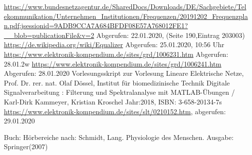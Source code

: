 \begin{thebibliography}{99}

 \url{https://www.bundesnetzagentur.de/SharedDocs/Downloads/DE/Sachgebiete/Telekommunikation/Unternehmen_Institutionen/Frequenzen/20191202_Frequenzplan.pdf;jsessionid=9ADB9CCA7A684BFDF08E57A768012FE1?__blob=publicationFile&v=2} Abgerufen: 22.01.2020, (Seite 190,Eintrag 203003)
 \url{https://de.wikipedia.org/wiki/Equalizer} Abgerufen: 25.01.2020, 10:56 Uhr
 \url{https://www.elektronik-kompendium.de/sites/grd/1006231.htm}
Abgerufen: 28.01.2w
 \url{https://www.elektronik-kompendium.de/sites/grd/1006241.htm} Abgerufen: 28.01.2020
 Vorlesungsskript zur Vorlesung Lineare Elektrische Netze, Prof. Dr. rer. nat. Olaf Dössel, Institut für biomedizinische Technik
 Digitale Signalverarbeitung : Filterung und Spektralanalyse mit MATLAB-Übungen / Karl-Dirk Kammeyer, Kristian Kroschel Jahr:2018, ISBN: 3-658-20134-7s
 \url{https://www.elektronik-kompendium.de/sites/slt/0210152.htm}, abgerufen: 29.01.2020


 Buch: Hörbereiche nach: Schmidt, Lang. Physiologie des Menschen. Ausgabe: Springer(2007)






\end{thebibliography}
